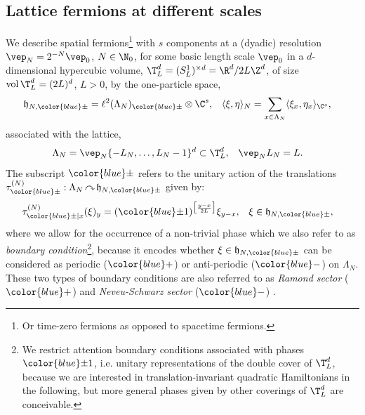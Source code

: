 \documentclass[a4paper, 11pt]{article}
\newcommand{\fh}{\mathfrak{h}}
\newcommand{\ltwo}{\ell^{2}}
\DeclareMathOperator{\1}{\mathds{1}}
\DeclareMathOperator{\vol}{vol}
\DeclareMathOperator{\act}{\curvearrowright}
\begin{document}
\subsection{Lattice fermions at different scales}
\label{sec:latfermi}
We describe spatial fermions\footnote{Or time-zero fermions as opposed to spacetime fermions.} with $s$ components at a (dyadic) resolution $\vep_{N}=2^{-N}\vep_{0}$, $N\in\N_{0}$, for some basic length scale $\vep_{0}$ in a $d$-dimensional hypercubic volume, $\T^{d}_{L} = (S^{1}_{L})^{\times d} = \R^{d}/2L\Z^{d}$, of size $\vol \T^{d}_{L} = (2L)^{d}$, $L>0$, by the one-particle space,
\begin{align}
\label{eq:1psp}
\fh_{N,{\color{blue}\pm}} & = \ltwo(\Lambda_{N})_{{\color{blue}\pm}}\otimes\C^{s}, & \langle\xi,\eta\rangle_{N} & = \sum_{x\in\Lambda_{N}}\langle\xi_{x},\eta_{x}\rangle_{\C^{s}}, 
\end{align}
associated with the lattice,
\begin{align}
\label{eq:latsp}
\Lambda_{N} & = \vep_{N}\{-L_{N},\dots,L_{N}-1\}^{d}\subset\T^{d}_{L}, & \vep_{N}L_{N} & = L.
\end{align}
The subscript ${\color{blue}\pm}$ refers to the unitary action of the translations $\tau^{(N)}_{{\color{blue}\pm}}:\Lambda_{N}\act\fh_{N,{\color{blue}\pm}}$ given by:
\begin{align}
\label{eq:translations}
\tau^{(N)}_{{\color{blue}\pm} |x}(\xi)_{y} & = ({\color{blue}\pm} 1)^{\big[\frac{y-x}{2L}\big]}\xi_{y-x}, & \xi & \in\fh_{N, {\color{blue}\pm}},
\end{align}
where we allow for the occurrence of a non-trivial phase which we also refer to as \textit{boundary condition}\footnote{We restrict attention boundary conditions associated with phases ${\color{blue}\pm} 1$, i.e. unitary representations of the double cover of $\T^{d}_{L}$, because we are interested in translation-invariant quadratic Hamiltonians in the following, but more general phases given by other coverings of $\T^{d}_{L}$ are conceivable.}, because it encodes whether $\xi\in\fh_{N, {\color{blue}\pm}}$ can be considered as periodic (${\color{blue}+} $) or anti-periodic (${\color{blue}-}$) on $\Lambda_{N}$. These two types of boundary conditions are also referred to as \textit{Ramond sector} (${\color{blue}+}$) and \textit{Neveu-Schwarz sector} (${\color{blue}-}$) \cite{DiFrancescoCFTBook, EvansQuantumSymmetriesOn}.
\end{document}
